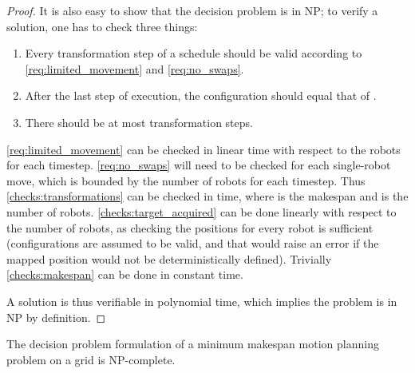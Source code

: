 \begin{proof}
	It is also easy to show that the decision problem is in NP; to verify a solution, one has to check three things:
	\begin{enumerate}
		\item Every transformation step of a schedule should be valid according to \cref{req:limited_movement} and \cref{req:no_swaps}.\label{checks:transformations}
		\item After the last step of execution, the configuration should equal that of .\label{checks:target_acquired}
		\item There should be at most  transformation steps.\label{checks:makespan}
	\end{enumerate}
	\cref{req:limited_movement} can be checked in linear time with respect to the robots for each timestep. \cref{req:no_swaps} will need to be checked for each single-robot move, which is bounded by the number of robots for each timestep. Thus \cref{checks:transformations} can be checked in  time, where  is the makespan and  is the number of robots. \cref{checks:target_acquired} can be done linearly with respect to the number of robots, as checking the positions for every robot is sufficient (configurations are assumed to be valid, and that  would raise an error if the mapped position would not be deterministically defined). Trivially \cref{checks:makespan} can be done in constant time. 

	A solution is thus verifiable in polynomial time, which implies the problem is in NP by definition.
\end{proof}

\begin{theorem}\label{thm:npc}
	The decision problem formulation of a minimum makespan motion planning problem on a grid is NP-complete.
\end{theorem}

